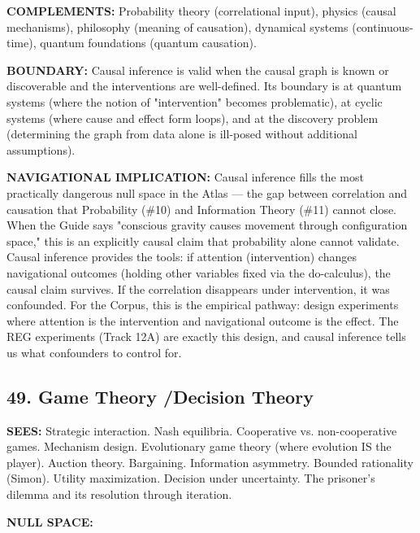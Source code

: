 \textbf{COMPLEMENTS:} Probability theory (correlational input), physics (causal mechanisms), philosophy (meaning of causation), dynamical systems (continuous-time), quantum foundations (quantum causation).


\textbf{BOUNDARY:} Causal inference is valid when the causal graph is known or discoverable and the interventions are well-defined. Its boundary is at quantum systems (where the notion of "intervention" becomes problematic), at cyclic systems (where cause and effect form loops), and at the discovery problem (determining the graph from data alone is ill-posed without additional assumptions).


\textbf{NAVIGATIONAL IMPLICATION:} Causal inference fills the most practically dangerous null space in the Atlas — the gap between correlation and causation that Probability (\#10) and Information Theory (\#11) cannot close. When the Guide says "conscious gravity causes movement through configuration space," this is an explicitly causal claim that probability alone cannot validate. Causal inference provides the tools: if attention (intervention) changes navigational outcomes (holding other variables fixed via the do-calculus), the causal claim survives. If the correlation disappears under intervention, it was confounded. For the Corpus, this is the empirical pathway: design experiments where attention is the intervention and navigational outcome is the effect. The REG experiments (Track 12A) are exactly this design, and causal inference tells us what confounders to control for.


\bigskip\noindent\makebox[\textwidth]{\color{rulegray}\rule{5cm}{0.3pt}}\bigskip


\subsection*{49. Game Theory /\allowbreak  Decision Theory}


\textbf{SEES:} Strategic interaction. Nash equilibria. Cooperative vs. non-cooperative games. Mechanism design. Evolutionary game theory (where evolution IS the player). Auction theory. Bargaining. Information asymmetry. Bounded rationality (Simon). Utility maximization. Decision under uncertainty. The prisoner's dilemma and its resolution through iteration.


\textbf{NULL SPACE:}

